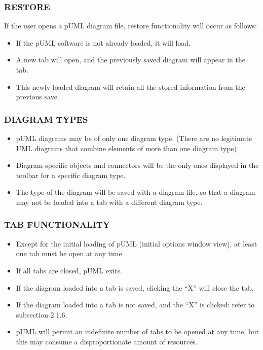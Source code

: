 \documentclass[twoside,letterpaper]{article}
\begin{document}
{\bigskip


\subsubsection[RESTORE]{\bfseries RESTORE}

If the user opens a pUML diagram file, restore functionality will occur as follows:
\begin{itemize}
\item If the pUML software is not already loaded, it will load.
\item A new tab will open, and the previously saved diagram will appear in the tab.
\item This newly-loaded diagram will retain all the stored information from the previous save.
\end{itemize}


\bigskip

\subsubsection[DIAGRAM TYPES]{\bfseries DIAGRAM TYPES}

\begin{itemize}
\item pUML diagrams may be of only one diagram type. (There are no legitimate UML diagrams that combine elements of more than one diagram type)
\item Diagram-specific objects and connectors will be the only ones displayed in the toolbar for a specific diagram type.
\item The type of the diagram will be saved with a diagram file, so that a diagram may not be loaded into a tab with a different diagram type.
\end{itemize}


\bigskip

\subsubsection[TAB FUNCTIONALITY]{\bfseries TAB FUNCTIONALITY}

\begin{itemize}
\item Except for the initial loading of pUML (initial options window view), at least one tab must be open at any time.
\item If all tabs are closed, pUML exits.
\item If the diagram loaded into a tab is saved, clicking the ``X'' will close the tab.
\item If the diagram loaded into a tab is not saved, and the ``X'' is clicked: refer to subsection 2.1.6.
\item pUML will permit an indefinite number of tabs to be opened at any time, but this may consume a disproportionate amount of resources.
\end{itemize}



\bigskip




}
\end{document}
